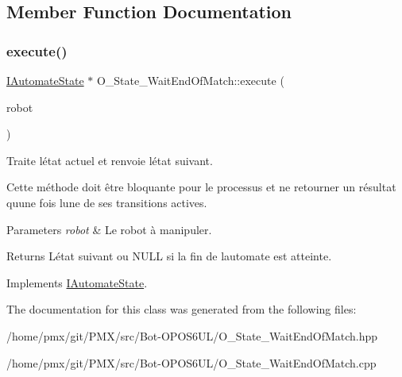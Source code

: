 \subsection{Member Function Documentation}
\mbox{\label{classO__State__WaitEndOfMatch_aa73613440b37c8dd42181e2e0265ae86}} 
\subsubsection{\texorpdfstring{execute()}{execute()}}
{\footnotesize\ttfamily \hyperlink{classIAutomateState}{I\+Automate\+State} $\ast$ O\+\_\+\+State\+\_\+\+Wait\+End\+Of\+Match\+::execute (\begin{DoxyParamCaption}\item[{\hyperlink{classRobot}{Robot} \&}]{robot }\end{DoxyParamCaption})\hspace{0.3cm}{\ttfamily [virtual]}}



Traite l\textquotesingle{}état actuel et renvoie l\textquotesingle{}état suivant. 

Cette méthode doit être bloquante pour le processus et ne retourner un résultat qu\textquotesingle{}une fois l\textquotesingle{}une de ses transitions actives.


\begin{DoxyParams}{Parameters}
{\em robot} & Le robot à manipuler. \\
\hline
\end{DoxyParams}
\begin{DoxyReturn}{Returns}
L\textquotesingle{}état suivant ou {\ttfamily N\+U\+LL} si la fin de l\textquotesingle{}automate est atteinte. 
\end{DoxyReturn}


Implements \hyperlink{classIAutomateState_a58bf3c2c5b55f7ba3fc1783fc36e102b}{I\+Automate\+State}.



The documentation for this class was generated from the following files\+:\begin{DoxyCompactItemize}
\item 
/home/pmx/git/\+P\+M\+X/src/\+Bot-\/\+O\+P\+O\+S6\+U\+L/O\+\_\+\+State\+\_\+\+Wait\+End\+Of\+Match.\+hpp\item 
/home/pmx/git/\+P\+M\+X/src/\+Bot-\/\+O\+P\+O\+S6\+U\+L/O\+\_\+\+State\+\_\+\+Wait\+End\+Of\+Match.\+cpp\end{DoxyCompactItemize}
